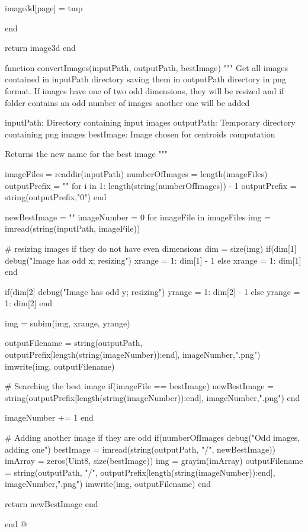 \documentclass[11pt,oneside]{article}	%
\begin{document}
{    image3d[page] = tmp

  end

  return image3d
end

function convertImages(inputPath, outputPath, bestImage)
  """
  Get all images contained in inputPath directory
  saving them in outputPath directory in png format.
  If images have one of two odd dimensions, they will be resized
  and if folder contains an odd number of images another one will be
  added

  inputPath: Directory containing input images
  outputPath: Temporary directory containing png images
  bestImage: Image chosen for centroids computation

  Returns the new name for the best image
  """

  imageFiles = readdir(inputPath)
  numberOfImages = length(imageFiles)
  outputPrefix = ""
  for i in 1: length(string(numberOfImages)) - 1
    outputPrefix = string(outputPrefix,"0")
  end

  newBestImage = ""
  imageNumber = 0
  for imageFile in imageFiles
    img = imread(string(inputPath, imageFile))

    # resizing images if they do not have even dimensions
    dim = size(img)
    if(dim[1] %
      debug("Image has odd x; resizing")
      xrange = 1: dim[1] - 1
    else
      xrange = 1: dim[1]
    end

    if(dim[2] %
      debug("Image has odd y; resizing")
      yrange = 1: dim[2] - 1
    else
      yrange = 1: dim[2]
    end

    img = subim(img, xrange, yrange)

    outputFilename = string(outputPath, outputPrefix[length(string(imageNumber)):end], imageNumber,".png")
    imwrite(img, outputFilename)

    # Searching the best image
    if(imageFile == bestImage)
      newBestImage = string(outputPrefix[length(string(imageNumber)):end], imageNumber,".png")
    end

    imageNumber += 1
  end

  # Adding another image if they are odd
  if(numberOfImages %
    debug("Odd images, adding one")
    bestImage = imread(string(outputPath, "/", newBestImage))
    imArray = zeros(Uint8, size(bestImage))
    img = grayim(imArray)
    outputFilename = string(outputPath, "/", outputPrefix[length(string(imageNumber)):end], imageNumber,".png")
    imwrite(img, outputFilename)
  end

  return newBestImage
end

end
@}
\end{document}
